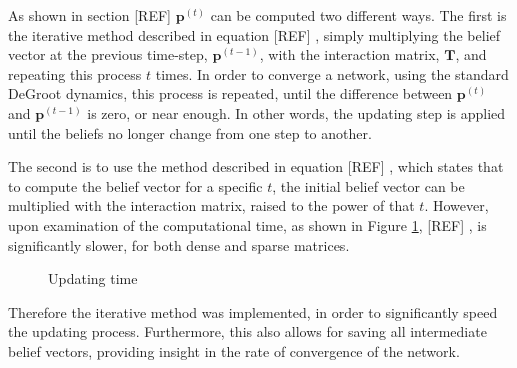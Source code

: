\documentclass[a4paper, 12pt]{report}
\newcommand{\T}{\bm{T}}
\begin{document}
As shown in section [REF] $\bm{p}^{(t)}$ can be computed two different ways. The first is the iterative method described in equation [REF] , simply multiplying the belief vector at the previous time-step, $\bm{p}^{(t-1)}$, with the interaction matrix, $\T$, and repeating this process $t$ times. In order to converge a network, using the standard DeGroot dynamics, this process is repeated, until the difference between $\bm{p}^{(t)}$ and $\bm{p}^{(t-1)}$ is zero, or near enough. In other words, the updating step is applied until the beliefs no longer change from one step to another.

The second is to use the method described in equation [REF] , which states that to compute the belief vector for a specific $t$, the initial belief vector can be multiplied with the interaction matrix, raised to the power of that $t$. However, upon examination of the computational time, as shown in Figure \ref{update:time}, [REF] , is significantly slower, for both dense and sparse matrices.
\begin{figure}[!htbp]%
    \centering
    \qquad
    \caption{Updating time}%
    \label{update:time}%
\end{figure}

Therefore the iterative method was implemented, in order to significantly speed the updating process. Furthermore, this also allows for saving all intermediate belief vectors, providing insight in the rate of convergence of the network.
\end{document}
